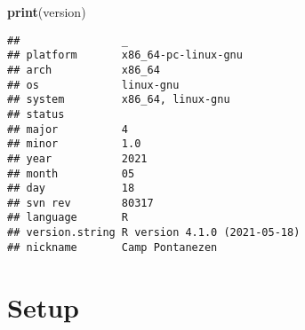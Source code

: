 \documentclass[]{book}
\newenvironment{Shaded}{\begin{snugshade}}{\end{snugshade}}
\newcommand{\KeywordTok}[1]{\textcolor[rgb]{0.13,0.29,0.53}{\textbf{#1}}}
\newcommand{\NormalTok}[1]{#1}
\begin{document}
\begin{Shaded}
\begin{Highlighting}[]
\KeywordTok{print}\NormalTok{(version)}
\end{Highlighting}
\end{Shaded}

\begin{verbatim}
##                _                           
## platform       x86_64-pc-linux-gnu         
## arch           x86_64                      
## os             linux-gnu                   
## system         x86_64, linux-gnu           
## status                                     
## major          4                           
## minor          1.0                         
## year           2021                        
## month          05                          
## day            18                          
## svn rev        80317                       
## language       R                           
## version.string R version 4.1.0 (2021-05-18)
## nickname       Camp Pontanezen
\end{verbatim}

\hypertarget{setup-1}{%
\section{Setup}\label{setup-1}}
\end{document}
